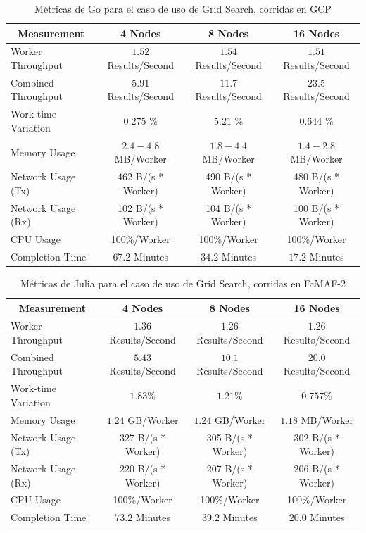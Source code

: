 \documentclass[11pt]{article}
\newcommand{\gscap}[2]{\caption{Métricas de #1 para el caso de uso de Grid Search, corridas en #2}}
\begin{document}
\begin{table}[H]
\centering
\begin{tabular}{|l|c|c|c|}
\hline
\multicolumn{1}{|c|}{Measurement} & 4 Nodes & 8 Nodes & 16 Nodes \\ \hline
Worker Throughput & $1.52$ Results/Second & $1.54$ Results/Second & $1.51$ Results/Second \\ \hline
Combined Throughput & $5.91$ Results/Second & $11.7$ Results/Second & $23.5$ Results/Second \\ \hline
Work-time Variation & $0.275$ \% & $5.21$ \% & $0.644$ \% \\ \hline
Memory Usage & $2.4-4.8$ MB/Worker & $1.8-4.4$ MB/Worker & $1.4-2.8$ MB/Worker \\ \hline
Network Usage (Tx) & 462 B/(s * Worker) & 490 B/(s * Worker) & 480 B/(s * Worker) \\ \hline
Network Usage (Rx) & 102 B/(s * Worker) & 104 B/(s * Worker) & 100 B/(s * Worker) \\ \hline
CPU Usage & 100\%/Worker & 100\%/Worker & 100\%/Worker \\ \hline
Completion Time & $67.2$ Minutes & $34.2$ Minutes & $17.2$ Minutes \\ \hline
\end{tabular}
\gscap{Go}{GCP}
\end{table}

\begin{table}[H]
\centering
\begin{tabular}{|l|c|c|c|}
\hline
\multicolumn{1}{|c|}{Measurement} & 4 Nodes & 8 Nodes & 16 Nodes \\ \hline
Worker Throughput & $1.36$ Results/Second & $1.26$ Results/Second & $1.26$ Results/Second \\ \hline
Combined Throughput & $5.43$ Results/Second & $10.1$ Results/Second & $20.0$ Results/Second \\ \hline
Work-time Variation & $1.83\%$& $1.21\%$& $0.757$\% \\ \hline
Memory Usage & $1.24$ GB/Worker & $1.24$ GB/Worker & $1.18$ MB/Worker \\ \hline
Network Usage (Tx) & 327 B/(s * Worker) & 305 B/(s * Worker) & 302 B/(s * Worker) \\ \hline
Network Usage (Rx) & 220 B/(s * Worker) & 207 B/(s * Worker) & 206 B/(s * Worker) \\ \hline
CPU Usage & 100\%/Worker & 100\%/Worker & 100\%/Worker \\ \hline
Completion Time & $73.2$ Minutes & $39.2$ Minutes & $20.0$ Minutes \\ \hline
\end{tabular}
\gscap{Julia}{FaMAF-2}\label{tab:jl:gs:famaf2}
\end{table}
\end{document}
